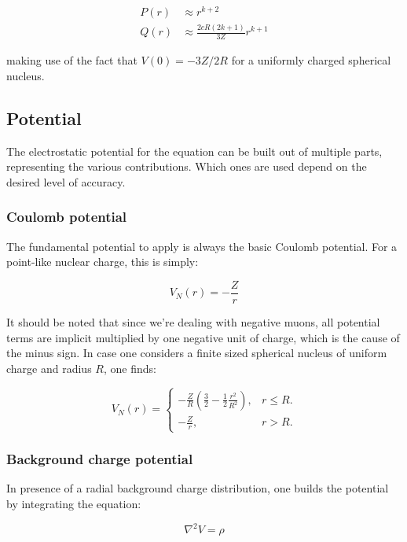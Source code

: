 \documentclass[]{report}
\begin{document}
\begin{align}
P(r) &\approx r^{k+2} \\
Q(r) &\approx \frac{2cR(2k+1)}{3Z}r^{k+1}
\end{align}

making use of the fact that $V(0) = -3Z/2R$ for a uniformly charged spherical nucleus.

\subsection{Potential}\label{num_pot}

The electrostatic potential for the equation can be built out of multiple parts, representing the various contributions. Which ones are used depend on the desired level of accuracy.

\subsubsection{Coulomb potential}

The fundamental potential to apply is always the basic Coulomb potential. For a point-like nuclear charge, this is simply:

\begin{equation}
	V_N(r) = -\frac{Z}{r}
\end{equation}

It should be noted that since we're dealing with negative muons, all potential terms are implicit multiplied by one negative unit of charge, which is the cause of the minus sign. In case one considers a finite sized spherical nucleus of uniform charge and radius $R$, one finds:

\begin{equation}
V_N(r) = \begin{cases}
-\frac{Z}{R}\left(\frac{3}{2}-\frac{1}{2}\frac{r^2}{R^2}\right), & \text{$r\leq R$}.\\
-\frac{Z}{r}, & \text{$r > R$}.
\end{cases}
\end{equation}

\subsubsection{Background charge potential}\label{subsec_bkg_pot}
In presence of a radial background charge distribution, one builds the potential by integrating the equation:

\begin{equation}
\nabla^2 V = \rho
\end{equation}
\end{document}
